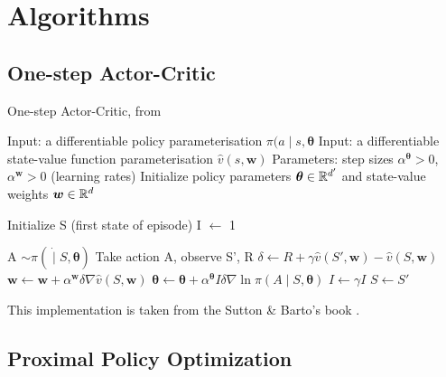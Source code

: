 \chapter{Algorithms}
\label{app:algs}

\section{One-step Actor-Critic}
\label{app:algs_ActorCritic}
\begin{algorithm}
\caption{One-step Actor-Critic, from \cite{suttonAndBartoBook}} \label{alg:OneStepActorCritic}
    \begin{algorithmic}[1]
    \State Input: a differentiable policy parameterisation $\pi (a \mid s, \boldsymbol{\theta}$
    \State Input: a differentiable state-value function parameterisation $\hat{v}(s, \boldsymbol{w})$
    \State Parameters: step sizes $\alpha^{\boldsymbol{\theta}} > 0$, $\alpha^{\boldsymbol{w}} > 0$ (learning rates)
    \State Initialize policy parameters $\boldsymbol{\theta} \in \mathbb{R}^{d'}$ and state-value weights $\boldsymbol{w} \in \mathbb{R}^d$
    
        \State Initialize S (first state of episode)
        \State I $\gets$ 1
        
        
            \State A $\sim \pi ( \dot \mid S, \boldsymbol{\theta})$
            \State Take action A, observe S', R
            \State $\delta \leftarrow R + \gamma \hat{v}(S', \boldsymbol{w}) - \hat{v}(S, \boldsymbol{w})$
            \State $\boldsymbol{w} \leftarrow \boldsymbol{w} + \alpha^{\boldsymbol{w}} \delta \nabla \hat{v}(S, \boldsymbol{w})$
            \State $\boldsymbol{\theta} \leftarrow \boldsymbol{\theta} + \alpha^{\boldsymbol{\theta}} I \delta \nabla \ln \pi (A \mid S, \boldsymbol{\theta})$
            \State $I \leftarrow \gamma I$
            \State $S \leftarrow S'$
        \EndWhile
    \EndFor
    \end{algorithmic}
\end{algorithm}
\noindent
This implementation is taken from the Sutton \& Barto's book \cite{suttonAndBartoBook}.

\newpage
\section{Proximal Policy Optimization}
\label{app:algs_PPO}

